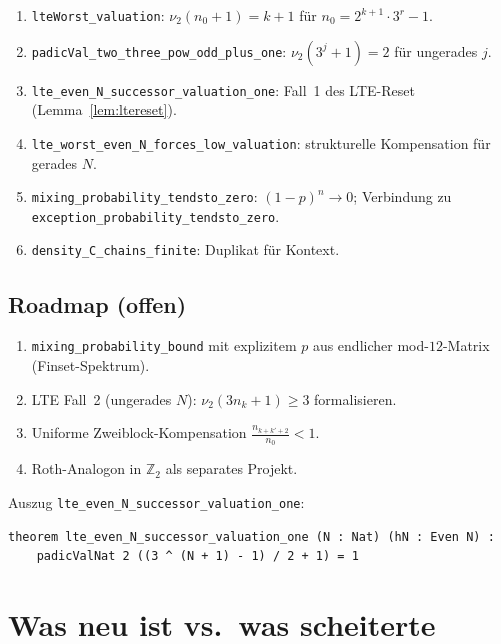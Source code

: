 \documentclass[12pt,a4paper]{article}
\newcommand{\vii}{\nu_2}
\begin{document}
\begin{enumerate}[label=(\roman*)]
  \item \texttt{lteWorst\_valuation}: $\vii(n_0+1)=k+1$ für
    $n_0=2^{k+1}\cdot 3^r-1$.
  \item \texttt{padicVal\_two\_three\_pow\_odd\_plus\_one}:
    $\vii(3^j+1)=2$ für ungerades $j$.
  \item \texttt{lte\_even\_N\_successor\_valuation\_one}:
    Fall~1 des LTE-Reset (Lemma~\ref{lem:ltereset}).
  \item \texttt{lte\_worst\_even\_N\_forces\_low\_valuation}:
    strukturelle Kompensation für gerades $N$.
  \item \texttt{mixing\_probability\_tendsto\_zero}:
    $(1-p)^n\to 0$; Verbindung zu
    \texttt{exception\_probability\_tendsto\_zero}.
  \item \texttt{density\_C\_chains\_finite}: Duplikat für Kontext.
\end{enumerate}

\subsection{Roadmap (offen)}

\begin{enumerate}[label=(\roman*)]
  \item \texttt{mixing\_probability\_bound} mit explizitem $p$ aus
    endlicher mod-$12$-Matrix (Finset-Spektrum).
  \item LTE Fall~2 (ungerades $N$): $\vii(3n_k+1)\geq 3$ formalisieren.
  \item Uniforme Zweiblock-Kompensation $\frac{n_{k+k'+2}}{n_0}<1$.
  \item Roth-Analogon in $\mathbb{Z}_2$ als separates Projekt.
\end{enumerate}

Auszug \texttt{lte\_even\_N\_successor\_valuation\_one}:
\begin{lstlisting}
theorem lte_even_N_successor_valuation_one (N : Nat) (hN : Even N) :
    padicValNat 2 ((3 ^ (N + 1) - 1) / 2 + 1) = 1
\end{lstlisting}

\section{Was neu ist vs.\ was scheiterte}
\label{sec:ehrlich}
\end{document}
